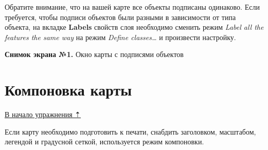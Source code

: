 \documentclass[12pt,]{book}
\begin{document}
Обратите внимание, что на вашей карте все объекты подписаны одинаково. Если требуется, чтобы подписи объектов были разными в зависимости от типа объекта, на вкладке \textbf{Labels} свойств слоя необходимо сменить режим \emph{Label all the features the same way} на режим \emph{Define classes\ldots{}} и произвести настройку.

\textbf{Снимок экрана №1.} Окно карты с подписями объектов

\hypertarget{map-design-quaternary-layout}{%
\section{Компоновка карты}\label{map-design-quaternary-layout}}

\protect\hyperlink{map-design-quaternary}{В начало упражнения ⇡}

Если карту необходимо подготовить к печати, снабдить заголовком, масштабом, легендой и градусной сеткой, используется режим компоновки.
\end{document}
